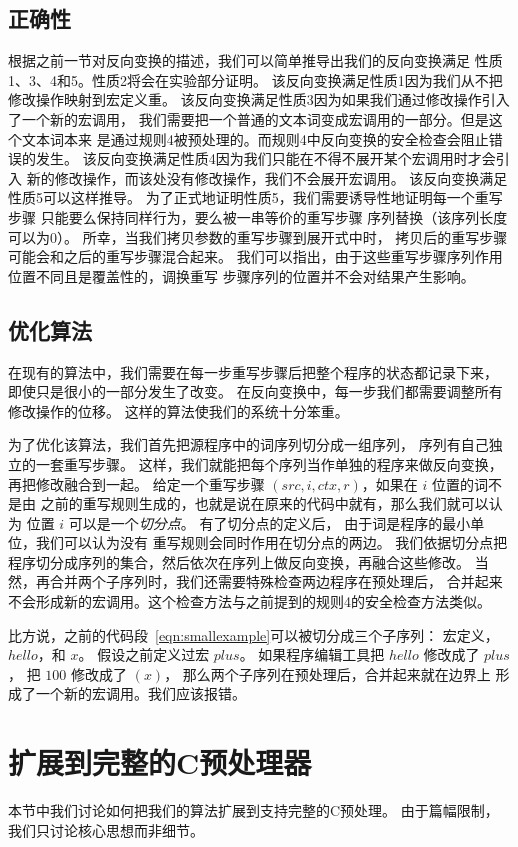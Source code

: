 \subsection{正确性}\label{sec:correctness}
根据之前一节对反向变换的描述，我们可以简单推导出我们的反向变换满足
性质1、3、4和5。性质2将会在实验部分证明。
该反向变换满足性质1因为我们从不把修改操作映射到宏定义重。
该反向变换满足性质3因为如果我们通过修改操作引入了一个新的宏调用，
我们需要把一个普通的文本词变成宏调用的一部分。但是这个文本词本来
是通过规则4被预处理的。而规则4中反向变换的安全检查会阻止错误的发生。
该反向变换满足性质4因为我们只能在不得不展开某个宏调用时才会引入
新的修改操作，而该处没有修改操作，我们不会展开宏调用。
该反向变换满足性质5可以这样推导。
为了正式地证明性质5，我们需要诱导性地证明每一个重写步骤
只能要么保持同样行为，要么被一串等价的重写步骤
序列替换（该序列长度可以为0）。
所幸，当我们拷贝参数的重写步骤到展开式中时，
拷贝后的重写步骤可能会和之后的重写步骤混合起来。
我们可以指出，由于这些重写步骤序列作用位置不同且是覆盖性的，调换重写
步骤序列的位置并不会对结果产生影响。

\subsection{优化算法}\label{sec:optimization}
在现有的算法中，我们需要在每一步重写步骤后把整个程序的状态都记录下来，
即使只是很小的一部分发生了改变。
在反向变换中，每一步我们都需要调整所有修改操作的位移。
这样的算法使我们的系统十分笨重。

为了优化该算法，我们首先把源程序中的词序列切分成一组序列，
序列有自己独立的一套重写步骤。
这样，我们就能把每个序列当作单独的程序来做反向变换，再把修改融合到一起。
给定一个重写步骤 $(src, i, ctx, r)$，如果在 $i$ 位置的词不是由
之前的重写规则生成的，也就是说在原来的代码中就有，那么我们就可以认为
位置 $i$ 可以是一个\emph{切分点}。
有了切分点的定义后， 由于词是程序的最小单位，我们可以认为没有
重写规则会同时作用在切分点的两边。
我们依据切分点把程序切分成序列的集合，然后依次在序列上做反向变换，再融合这些修改。
当然，再合并两个子序列时，我们还需要特殊检查两边程序在预处理后，
合并起来不会形成新的宏调用。这个检查方法与之前提到的规则4的安全检查方法类似。

比方说，之前的代码段~\ref{eqn:smallexample}可以被切分成三个子序列：
宏定义， $hello$，和 $x$。
假设之前定义过宏 $plus$。 如果程序编辑工具把 $hello$ 修改成了 $plus$，
把 $100$ 修改成了 $(x)$， 那么两个子序列在预处理后，合并起来就在边界上
形成了一个新的宏调用。我们应该报错。


\section{扩展到完整的C预处理器}\label{sec:fullC}
本节中我们讨论如何把我们的算法扩展到支持完整的C预处理。
由于篇幅限制，我们只讨论核心思想而非细节。


